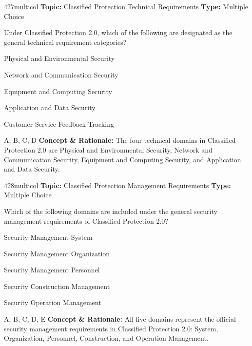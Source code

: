 \begin{qcard}{427}{multicol}
\textcolor{darkslate!75}{\small\textbf{Topic:} Classified Protection Technical Requirements \hfill \textbf{Type:} Multiple Choice}\vspace{0.4em}\par
Under Classified Protection 2.0, which of the following are designated as the general technical requirement categories?
\begin{qoptions}
\item Physical and Environmental Security
\item Network and Communication Security
\item Equipment and Computing Security
\item Application and Data Security
\item Customer Service Feedback Tracking
\end{qoptions}
\end{qcard}
\nopagebreak
\begin{explainbox}{A, B, C, D}
\textbf{Concept \& Rationale:} The four technical domains in Classified Protection 2.0 are Physical and Environmental Security, Network and Communication Security, Equipment and Computing Security, and Application and Data Security.
\end{explainbox}

\begin{qcard}{428}{multicol}
\textcolor{darkslate!75}{\small\textbf{Topic:} Classified Protection Management Requirements \hfill \textbf{Type:} Multiple Choice}\vspace{0.4em}\par
Which of the following domains are included under the general security management requirements of Classified Protection 2.0?
\begin{qoptions}
\item Security Management System
\item Security Management Organization
\item Security Management Personnel
\item Security Construction Management
\item Security Operation Management
\end{qoptions}
\end{qcard}
\nopagebreak
\begin{explainbox}{A, B, C, D, E}
\textbf{Concept \& Rationale:} All five domains represent the official security management requirements in Classified Protection 2.0: System, Organization, Personnel, Construction, and Operation Management.
\end{explainbox}

